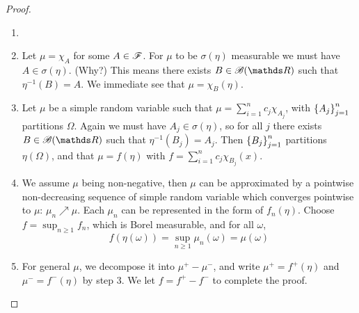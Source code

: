 \begin{proof}
\begin{enumerate}
    \item[]
    \item Let $\mu = \chi_A$ for some $A \in \mathcal{F}$. For $\mu$ to be $\sigma(\eta)$ measurable we must have $A \in \sigma(\eta)$. (Why?) This means there exists $B \in \B(\R)$ such that $\eta^{-1}(B) = A$. We immediate see that $\mu = \chi_B(\eta)$.
    \item Let $\mu$ be a simple random variable such that $\mu = \sum_{i=1}^n c_j \chi_{A_j}$, with $\left\{ A_j \right \}_{j=1}^n$ partitions $\Omega$. Again we must have $A_j \in \sigma(\eta)$, so for all $j$ there exists $B \in \B(\R)$ such that $\eta^{-1}(B_j) = A_j$. Then $\left\{ B_j \right \}_{j=1}^n$ partitions $\eta(\Omega)$, and that $\mu = f(\eta)$ with $f = \sum_{i=1}^n c_j \chi_{B_j}(x)$.
    \item We assume $\mu$ being non-negative, then $\mu$ can be approximated by a pointwise non-decreasing sequence of simple random variable which converges pointwise to $\mu$: $\mu_n \nearrow \mu$. Each $\mu_n$ can be represented in the form of $f_n(\eta)$. Choose $f = \sup_{n\geq 1} f_n$, which is Borel measurable, and for all $\omega$, 
    \begin{equation}
        f(\eta(\omega)) = \sup_{n\geq 1} \mu_n(\omega) = \mu(\omega)
    \end{equation}
    \item For general $\mu$, we decompose it into $\mu^+ - \mu^-$, and write $\mu^+ = f^+(\eta)$ and $\mu^- = f^-(\eta)$ by step 3. We let $f = f^+ - f^-$ to complete the proof.
\end{enumerate}
\end{proof}

